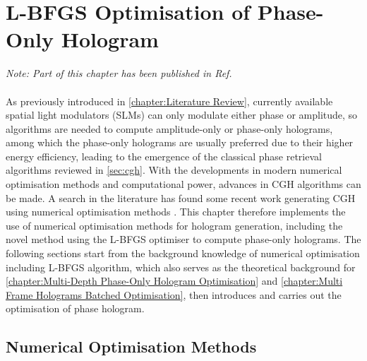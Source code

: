 \chapter{L-BFGS Optimisation of Phase-Only Hologram}
\label{chapter:L-BFGS Optimisation of Phase-Only Hologram}

\graphicspath{{Chapter_Optim2D/Figs/}}

\textit{Note: Part of this chapter has been published in Ref. \cite{Sha2022}}\\\\


As previously introduced in \cref{chapter:Literature Review}, currently available spatial light modulators (SLMs) can only modulate either phase or amplitude, so algorithms are needed to compute amplitude-only or phase-only holograms, among which the phase-only holograms are usually preferred due to their higher energy efficiency, leading to the emergence of the classical phase retrieval algorithms reviewed in \cref{sec:cgh}. With the developments in modern numerical optimisation methods and computational power, advances in CGH algorithms can be made. A search in the literature has found some recent work generating CGH using numerical optimisation methods \cite{Zhang2017, Liu2020, Choi2021, Chen2021}. This chapter therefore implements the use of numerical optimisation methods for hologram generation, including the novel method using the L-BFGS optimiser to compute phase-only holograms. The following sections start from the background knowledge of numerical optimisation including L-BFGS algorithm, which also serves as the theoretical background for \cref{chapter:Multi-Depth Phase-Only Hologram Optimisation} and \cref{chapter:Multi Frame Holograms Batched Optimisation}, then introduces and carries out the optimisation of phase hologram.



\section{Numerical Optimisation Methods} \label{sec:Numerical Optimisation Methods}

